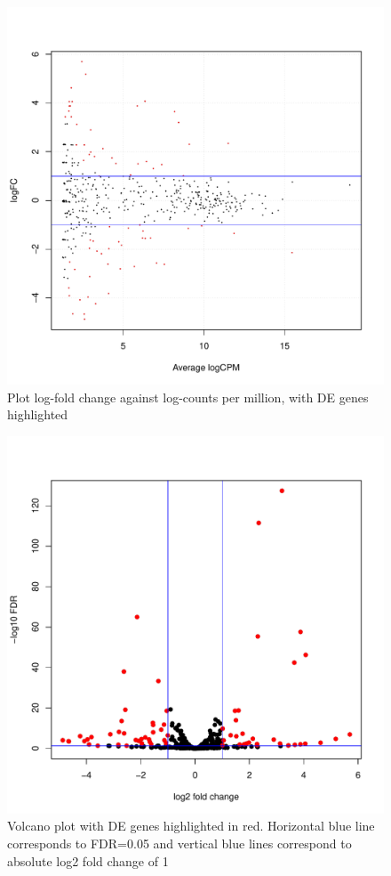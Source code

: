 \documentclass[12pt]{article}
\begin{document}
\begin{figure}[H]
\begin{center}
\includegraphics{9999_report-fig7}
\end{center}
\caption{Plot log-fold change against log-counts per million, with DE genes highlighted}
\end{figure} 

\begin{figure}[H]
\begin{center}
\includegraphics{9999_report-fig8}
\end{center}
\caption{Volcano plot with DE genes highlighted in red. Horizontal blue line corresponds to FDR=0.05 and vertical blue lines correspond to absolute log2 fold change of 1}
\end{figure} 
\end{document}
